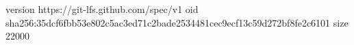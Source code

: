 version https://git-lfs.github.com/spec/v1
oid sha256:35dcf6fbb53e802c5ac3ed71c2bade2534481cec9ecf13c59d272bf8fe2c6101
size 22000
